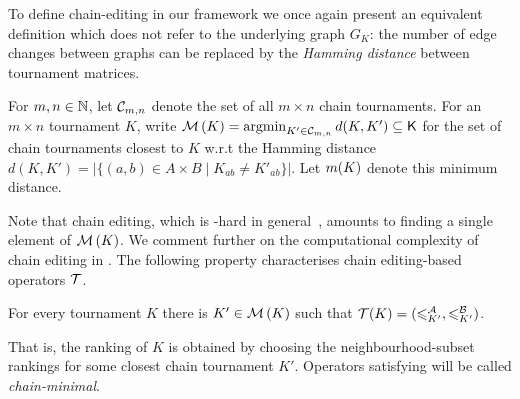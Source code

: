 To define chain-editing in our framework we once again present an equivalent
definition which does not refer to the underlying graph $G_K$: the number of
edge changes between graphs can be replaced by the \emph{Hamming distance}
between tournament matrices.

\begin{definition}
    For $m, n \in \mathbb{N}$, let $\mathcal{C}_{m,n}$ denote the set of all $m \times n$
    chain tournaments. For an $m \times n$ tournament $K$,
    write $\minch{K} = \argmin_{K' \in \ch_{m,n}}{d(K, K')} \subseteq \K$ for
    the set of chain tournaments closest to $K$ w.r.t the Hamming
    distance $d(K, K') = |\{(a,b) \in A \times B \mid K_{ab} \ne K'_{ab}\}|$.
    Let $m({K})$ denote this minimum distance.
\end{definition}

Note that chain editing, which is -hard in
general~\cite{jiao2017algorithms}, amounts to finding a single element of
$\operatorname{\mathcal{M}}\left({K}\right)$.\footnotemark{} We comment further on the computational complexity
of chain editing in . The following
property characterises chain editing-based operators $\mathcal{T}$.


\begin{axiom}[\chainmin{}]
    For every tournament $K$ there is $K' \in \operatorname{\mathcal{M}}\left({K}\right)$ such that $\mathcal{T}(K) =
    ({\leqslant^{\mathcal{A}}_{K'}}, {\leqslant^{\mathcal{B}}_{K'}})$.
\end{axiom}

\sloppy
That is, the ranking of $K$ is obtained by choosing the neighbourhood-subset
rankings for some closest chain tournament $K'$. Operators satisfying
\chainmin{} will be called \emph{chain-minimal}.

